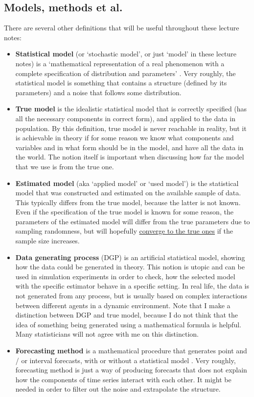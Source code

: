 \documentclass[
]{book}
\providecommand{\tightlist}{%
  \setlength{\itemsep}{0pt}\setlength{\parskip}{0pt}}
\theoremstyle{definition}
\theoremstyle{definition}
\theoremstyle{definition}
\theoremstyle{definition}
\theoremstyle{remark}
\begin{document}
\subsection{Models, methods et al.~}\label{modelsMethods}

There are several other definitions that will be useful throughout these lecture notes:

\begin{itemize}
\tightlist
\item
  \textbf{Statistical model} (or `stochastic model', or just `model' in these lecture notes) is a `mathematical representation of a real phenomenon with a complete specification of distribution and parameters' \citep{Svetunkov2019a}. Very roughly, the statistical model is something that contains a structure (defined by its parameters) and a noise that follows some distribution.
\item
  \textbf{True model} is the idealistic statistical model that is correctly specified (has all the necessary components in correct form), and applied to the data in population. By this definition, true model is never reachable in reality, but it is achievable in theory if for some reason we know what components and variables and in what form should be in the model, and have all the data in the world. The notion itself is important when discussing how far the model that we use is from the true one.
\item
  \textbf{Estimated model} (aka `applied model' or `used model') is the statistical model that was constructed and estimated on the available sample of data. This typically differs from the true model, because the latter is not known. Even if the specification of the true model is known for some reason, the parameters of the estimated model will differ from the true parameters due to sampling randomness, but will hopefully \hyperref[statistics]{converge to the true ones} if the sample size increases.
\item
  \textbf{Data generating process} (DGP) is an artificial statistical model, showing how the data could be generated in theory. This notion is utopic and can be used in simulation experiments in order to check, how the selected model with the specific estimator behave in a specific setting. In real life, the data is not generated from any process, but is usually based on complex interactions between different agents in a dynamic environment. Note that I make a distinction between DGP and true model, because I do not think that the idea of something being generated using a mathematical formula is helpful. Many statisticians will not agree with me on this distinction.
\item
  \textbf{Forecasting method} is a mathematical procedure that generates point and / or interval forecasts, with or without a statistical model \citep{Svetunkov2019a}. Very roughly, forecasting method is just a way of producing forecasts that does not explain how the components of time series interact with each other. It might be needed in order to filter out the noise and extrapolate the structure.
\end{itemize}
\end{document}
